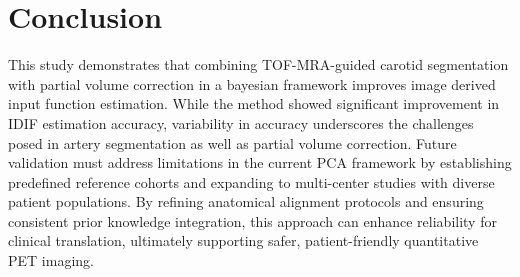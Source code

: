 \chapter{Conclusion}
This study demonstrates that combining TOF-MRA-guided carotid segmentation with partial volume correction in a bayesian framework improves image derived input function estimation.
While the method showed significant improvement in IDIF estimation accuracy, variability in accuracy underscores the challenges posed in artery segmentation as well as partial volume correction.
Future validation must address limitations in the current PCA framework by establishing predefined reference cohorts and expanding to multi-center studies with diverse patient populations.
By refining anatomical alignment protocols and ensuring consistent prior knowledge integration, this approach can enhance reliability for clinical translation, ultimately supporting safer, patient-friendly quantitative PET imaging.
